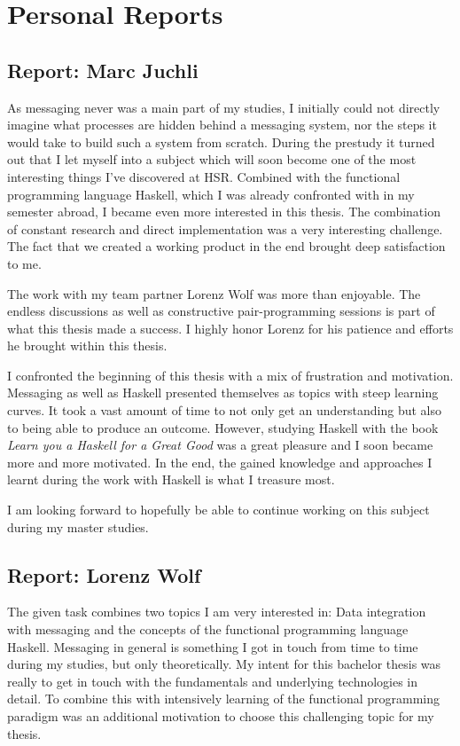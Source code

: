 \chapter{Personal Reports}

\section*{Report: Marc Juchli}
As messaging never was a main part of my studies, I initially could not
directly imagine what processes are hidden behind a messaging system, nor the
steps it would take to build such a system from scratch.  During the prestudy it
turned out that I let myself into a subject which will soon become one of the
most interesting things I've discovered at HSR. Combined with the functional
programming language Haskell, which I was already confronted with in my semester
abroad, I became even more interested in this thesis. The combination of
constant research and direct implementation was a very interesting challenge.
The fact that we created a working product in the end brought deep satisfaction
to me.

The work with my team partner Lorenz Wolf was more than enjoyable. The endless
discussions as well as constructive pair-programming sessions is part of what
this thesis made a success. I highly honor Lorenz for his patience and efforts
he brought within this thesis.

I confronted the beginning of this thesis with a mix of frustration and
motivation. Messaging as well as Haskell presented themselves as topics with
steep learning curves. It took a vast amount of time to not only get an
understanding but also to being able to produce an outcome.  However, studying
Haskell with the book \textit{Learn you a Haskell for a Great Good} was a great
pleasure and I soon became more and more motivated.  In the end, the gained
knowledge and approaches I learnt during the work with Haskell is what I
treasure most.

I am looking forward to hopefully be able to continue working on this subject
during my master studies.

\newpage
\section*{Report: Lorenz Wolf}

The given task combines two topics I am very interested in: Data integration
with messaging and the concepts of the functional programming language Haskell.
Messaging in general is something I got in touch from time to time during my
studies, but only theoretically. My intent for this bachelor thesis was really to
get in touch with the fundamentals and underlying technologies in detail. To
combine this with intensively learning of the functional programming paradigm was an
additional motivation to choose this challenging topic for my thesis.

